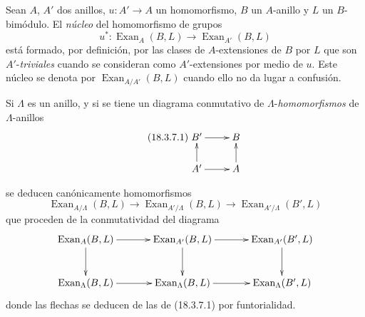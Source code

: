 \begin{env}[18.3.7]
\label{0.18.3.7-fr}
Sean $A$, $A'$ dos anillos, $u:A'\to A$ un homomorfismo, $B$ un
$A$-anillo y $L$ un $B$-bimódulo. El \emph{núcleo} del homomorfismo de
grupos
\[
  u^*:\operatorname{Exan}_A(B,L)\longrightarrow
  \operatorname{Exan}_{A'}(B,L)
\]
está formado, por definición, por las clases de $A$-extensiones de $B$ por $L$ que
son $A'$-\emph{triviales} cuando se consideran como $A'$-extensiones por
medio de $u$. Este núcleo se denota por
$\operatorname{Exan}_{A/A'}(B,L)$ cuando ello no da lugar a confusión.

Si $\Lambda$ es un anillo, y si se tiene un diagrama conmutativo de
$\Lambda$-\emph{homomorfismos} de $\Lambda$-anillos
\begin{equation}
\label{0.18.3.7.1-fr}
\tag{18.3.7.1}
  \xymatrix@C=2pc@R=1.5pc{
    B'\ar[r] & B\\
    A'\ar[u]\ar[r] & A\ar[u]
  }
\end{equation}


se deducen canónicamente homomorfismos
\begin{equation}
\label{0.18.3.7.2-fr}
\tag{18.3.7.2}
  \operatorname{Exan}_{A/\Lambda}(B,L)\longrightarrow
  \operatorname{Exan}_{A'/\Lambda}(B,L)\longrightarrow
  \operatorname{Exan}_{A'/\Lambda}(B',L)
\end{equation}
que proceden de la conmutatividad del diagrama
\[
  \xymatrix@C=2.8pc@R=2.3pc{
    \operatorname{Exan}_A(B,L)\ar[r]\ar[d]
      & \operatorname{Exan}_{A'}(B,L)\ar[r]\ar[d]
      & \operatorname{Exan}_{A'}(B',L)\ar[d]\\
    \operatorname{Exan}_{\Lambda}(B,L)\ar[r]
      & \operatorname{Exan}_{\Lambda}(B,L)\ar[r]
      & \operatorname{Exan}_{\Lambda}(B',L)
  }
\]
donde las flechas se deducen de las de (18.3.7.1) por funtorialidad.
\end{env}

